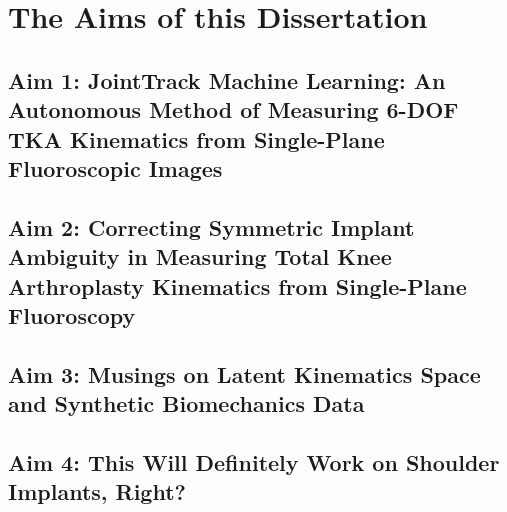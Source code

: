 \chapter{The Aims of this Dissertation}
\label{sec:aims}

\section{Aim 1: JointTrack Machine Learning: An Autonomous Method of Measuring 6-DOF TKA Kinematics from Single-Plane Fluoroscopic Images}
\label{sec:aim1}


\section{Aim 2: Correcting Symmetric Implant Ambiguity in Measuring Total Knee Arthroplasty Kinematics from Single-Plane Fluoroscopy}
\label{sec:aim2}


\section{Aim 3: Musings on Latent Kinematics Space and Synthetic Biomechanics Data}
\label{sec:aim3}


\section{Aim 4: This Will Definitely Work on Shoulder Implants, Right?}
\label{sec:aim4}




